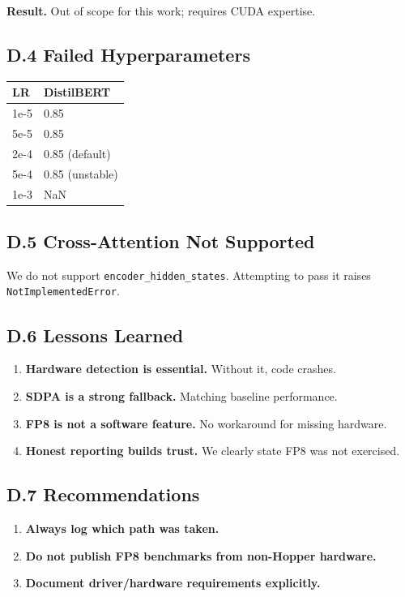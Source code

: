 \textbf{Result.} Out of scope for this work; requires CUDA expertise.

\subsection{D.4 Failed Hyperparameters}

\begin{table}[H]
\centering
\small
\begin{tabular}{ll}
\toprule
\textbf{LR} & \textbf{DistilBERT} \\
\midrule
1e-5 & 0.85 \\
5e-5 & 0.85 \\
2e-4 & 0.85 (default) \\
5e-4 & 0.85 (unstable) \\
1e-3 & NaN \\
\bottomrule
\end{tabular}
\end{table}

\subsection{D.5 Cross-Attention Not Supported}

We do not support \texttt{encoder\_hidden\_states}. Attempting to pass it raises 
\texttt{NotImplementedError}.

\subsection{D.6 Lessons Learned}

\begin{enumerate}
\item \textbf{Hardware detection is essential.} Without it, code crashes.
\item \textbf{SDPA is a strong fallback.} Matching baseline performance.
\item \textbf{FP8 is not a software feature.} No workaround for missing hardware.
\item \textbf{Honest reporting builds trust.} We clearly state FP8 was not exercised.

\end{enumerate}
\subsection{D.7 Recommendations}

\begin{enumerate}
\item \textbf{Always log which path was taken.}
\item \textbf{Do not publish FP8 benchmarks from non-Hopper hardware.}
\item \textbf{Document driver/hardware requirements explicitly.}

\end{enumerate}



